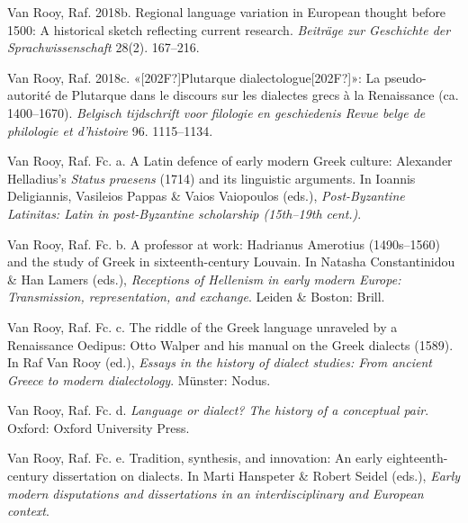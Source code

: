 \begin{styleStandard}
Van Rooy, Raf. 2018b. Regional language variation in European thought before 1500: A historical sketch reflecting current research. \textit{Beiträge zur Geschichte der Sprachwissenschaft} 28(2). 167–216.
\end{styleStandard}

\begin{styleStandard}
Van Rooy, Raf. 2018c. «[202F?]Plutarque dialectologue[202F?]»: La pseudo-autorité de Plutarque dans le discours sur les dialectes grecs à la Renaissance (ca. 1400–1670). \textit{Belgisch tijdschrift voor filologie en geschiedenis {\textbar} Revue belge de philologie et d’histoire} 96. 1115–1134.
\end{styleStandard}

\begin{styleStandard}
Van Rooy, Raf. Fc. a. A Latin defence of early modern Greek culture: Alexander Helladius’s \textit{Status praesens} (1714) and its linguistic arguments. In Ioannis Deligiannis, Vasileios Pappas \& Vaios Vaiopoulos (eds.), \textit{Post-Byzantine Latinitas: Latin in post-Byzantine scholarship (15th–19th cent.)}.
\end{styleStandard}

\begin{styleStandard}
Van Rooy, Raf. Fc. b. A professor at work: Hadrianus Amerotius (1490s–1560) and the study of Greek in sixteenth-century Louvain. In Natasha Constantinidou \& Han Lamers (eds.), \textit{Receptions of Hellenism in early modern Europe: Transmission, representation, and exchange}. Leiden \& Boston: Brill.
\end{styleStandard}

\begin{styleStandard}
Van Rooy, Raf. Fc. c. The riddle of the Greek language unraveled by a Renaissance Oedipus: Otto Walper and his manual on the Greek dialects (1589). In Raf Van Rooy (ed.), \textit{Essays in the history of dialect studies: From ancient Greece to modern dialectology}. Münster: Nodus.
\end{styleStandard}

\begin{styleStandard}
Van Rooy, Raf. Fc. d. \textit{Language or dialect? The history of a conceptual pair}. Oxford: Oxford University Press.
\end{styleStandard}

\begin{styleStandard}
Van Rooy, Raf. Fc. e. Tradition, synthesis, and innovation: An early eighteenth-century dissertation on dialects. In Marti Hanspeter \& Robert Seidel (eds.), \textit{Early modern disputations and dissertations in an interdisciplinary and European context}.
\end{styleStandard}

